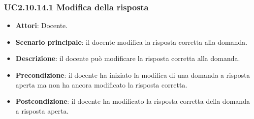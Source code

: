 \subsubsection{UC2.10.14.1 Modifica della risposta}
\begin{itemize}
\item \textbf{Attori}: Docente.
\item \textbf{Scenario principale}: il docente modifica la risposta corretta alla domanda.
\item \textbf{Descrizione}: il docente può modificare la risposta corretta alla domanda.
\item \textbf{Precondizione}: il docente ha iniziato la modifica di una domanda a risposta aperta ma non ha ancora modificato la risposta corretta.
\item \textbf{Postcondizione}: il docente ha modificato la risposta corretta della domanda a risposta aperta.
\end{itemize}
